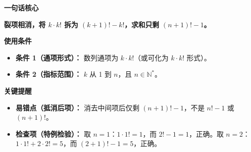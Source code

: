 \begin{summarybox}

	\textbf{\textcolor{CSummary}{一句话核心}}

	\textbf{裂项相消，将 $k\cdot k!$ 拆为 $(k+1)!-k!$，求和只剩 $(n+1)!-1$。}

	\medskip
	\textbf{\textcolor{CSummary}{使用条件}}
	\begin{itemize}[leftmargin=*, itemsep=0.5em, topsep=0.4em]
		\item \textbf{条件 1（通项形式）：} 数列通项为 $k\cdot k!$（或可化为 $k\cdot k!$ 形式）。
		\item \textbf{条件 2（指标范围）：} $k$ 从 1 到 $n$，且 $n\in\mathbb{N}^*$。
	\end{itemize}

	\medskip
	\textbf{\textcolor{CSummary}{关键提醒}}
	\begin{itemize}[leftmargin=*, itemsep=0.5em, topsep=0.4em]
		\item \textbf{易错点（抵消后项）：} 消去中间项后仅剩 $(n+1)!-1$，不是 $n!-1$ 或 $(n+1)!$。
		\item \textbf{检查项（特例检验）：} 取 $n=1$：$1\cdot1! = 1$，而 $2!-1 = 1$，正确。取 $n=2$：$1\cdot1!+2\cdot2! = 5$，而 $(2+1)!-1 = 5$，正确。
	\end{itemize}

\end{summarybox}

